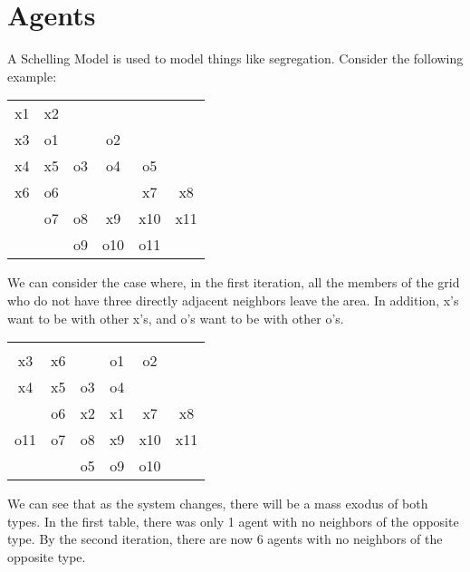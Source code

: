 \documentclass{hw}
\begin{document}
\section{Agents}
A Schelling Model is used to model things like segregation. Consider the following example:
\begin{center}
\begin{tabular}{c c c c c c}
x1 & x2 &    &    &    &    \\
x3 & o1 &    & o2 &    &    \\
x4 & x5 & o3 & o4 & o5 &    \\
x6 & o6 &    &    & x7 & x8 \\
   & o7 & o8 & x9 & x10 & x11 \\
   &    & o9 & o10 & o11 & \\
\end{tabular}
\end{center}
We can consider the case where, in the first iteration, all the members of the grid who do not have
three directly adjacent neighbors leave the area. In addition, x's want to be with other x's, and
o's want to be with other o's.
\begin{center}
\begin{tabular}{c c c c c c}
   &    &    &    &    &    \\
x3 & x6 &    & o1 & o2 &    \\
x4 & x5 & o3 & o4 &    &    \\
   & o6 & x2 & x1 & x7 & x8 \\
o11& o7 & o8 & x9 & x10 & x11 \\
   &    & o5 & o9 & o10 & \\
\end{tabular}
\end{center}
We can see that as the system changes, there will be a mass exodus of both types. In the first table,
there was only 1 agent with no neighbors of the opposite type. By the second iteration, there are now 6
agents with no neighbors of the opposite type.
\end{document}
